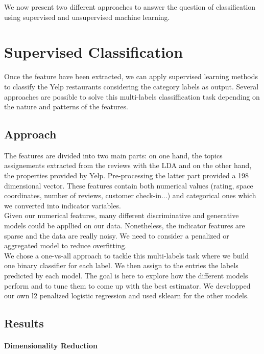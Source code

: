 \documentclass[twoside]{article}
\begin{document}
\begin{multicols}{2}
We now present two different approaches to answer the question of classification using supervised and unsupervised machine learning.\\

\section{Supervised Classification}

Once the feature have been extracted, we can apply supervised learning methods to classify the Yelp restaurants considering the category labels as output. Several approaches are possible to solve this multi-labels classiffication task depending on the nature and patterns of the features.

\subsection{Approach}

The features are divided into two main parts: on one hand, the topics assignements extracted from the reviews with the LDA and on the other hand, the properties provided by Yelp. Pre-processing the latter part provided a 198 dimensional vector. These features contain both numerical values (rating, space coordinates, number of reviews, customer check-in...) and categorical ones which we converted into indicator variables.\\

Given our numerical features, many different discriminative and generative models could be appllied on our data. Nonetheless, the indicator features are sparse and the data are really noisy. We need to consider a penalized or aggregated model to reduce overfitting.\\

We chose a one-vs-all approach to tackle this multi-labels task where we build one binary classifier for each label. We then assign to the entries the labels predicted by each model. The goal is here to explore how the different models perform and to tune them to come up with the best estimator. We developped our own l2 penalized logistic regression and used sklearn for the other models.

\subsection{Results}

\paragraph{Dimensionality Reduction}


\end{multicols}
\end{document}
